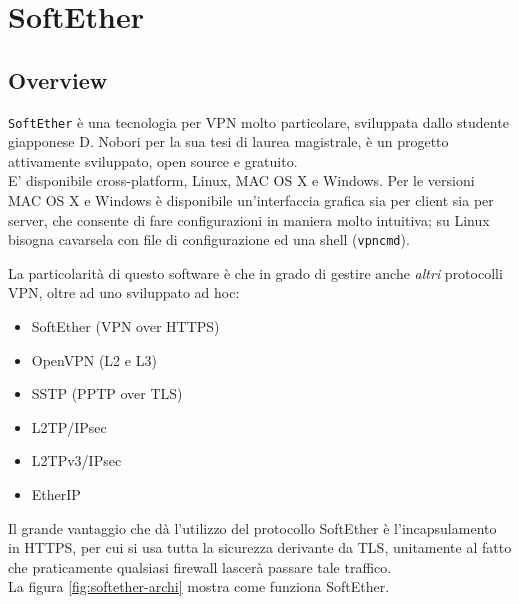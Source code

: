 \section{SoftEther}
\subsection{Overview}
\texttt{SoftEther} \cite{softether} è una tecnologia per VPN molto particolare, sviluppata dallo studente
giapponese D. Nobori per la sua tesi di laurea magistrale,
è un progetto
attivamente sviluppato, open source e gratuito.\\
E' disponibile cross-platform, Linux, MAC OS X e Windows. Per
le versioni MAC OS X e Windows è disponibile un'interfaccia grafica sia per client
sia per server, che consente di fare configurazioni in maniera molto intuitiva; su Linux
bisogna cavarsela con file di configurazione ed una shell (\texttt{vpncmd}).


La particolarità di questo software è che in grado di gestire anche \textit{altri}
protocolli VPN, oltre ad uno sviluppato ad hoc:
\begin{itemize}
  \item SoftEther (VPN over HTTPS)
  \item OpenVPN (L2  e L3)
  \item SSTP (PPTP over TLS)
  \item L2TP/IPsec
  \item L2TPv3/IPsec
  \item EtherIP
\end{itemize}
Il grande vantaggio che dà l'utilizzo del protocollo SoftEther è l'incapsulamento in
HTTPS, per cui si usa tutta la sicurezza derivante da TLS, unitamente al fatto che
praticamente qualsiasi firewall lascerà passare tale traffico.\\
La figura \ref{fig:softether-archi} mostra come funziona SoftEther.


